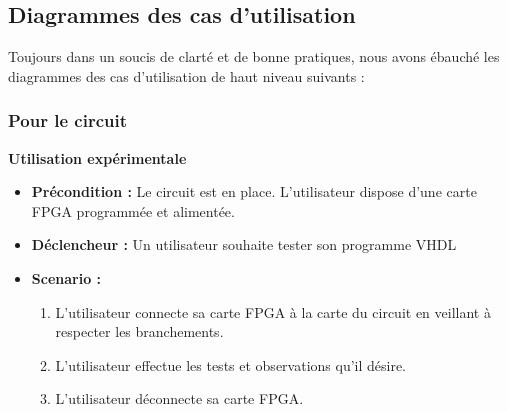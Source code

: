 \subsection{Diagrammes des cas d'utilisation}

Toujours dans un soucis de clarté et de bonne pratiques, nous avons ébauché les diagrammes des cas d'utilisation de haut niveau suivants :

	\subsubsection{Pour le circuit}


		\textbf{Utilisation expérimentale}
		\begin{itemize}
			\item \textbf{Précondition :} Le circuit est en place. L'utilisateur dispose d'une carte FPGA programmée et alimentée.
			\item \textbf{Déclencheur :} Un utilisateur souhaite tester son programme VHDL
			\item \textbf{Scenario :}
			\begin{enumerate}
				\item L'utilisateur connecte sa carte FPGA à la carte du circuit en veillant à respecter les branchements.
				\item L'utilisateur effectue les tests et observations qu'il désire.
				\item L'utilisateur déconnecte sa carte FPGA.
			\end{enumerate}
		\end{itemize}
		\newpage


